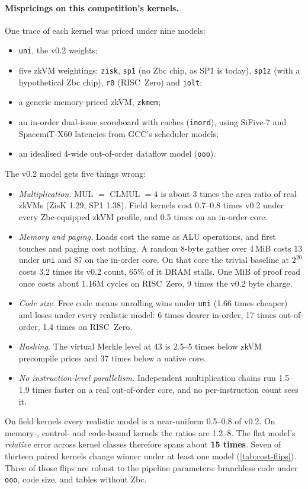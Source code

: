 \paragraph{Mispricings on this competition's kernels.} One trace of each kernel was priced under nine
models:
\begin{itemize}[nosep]
\item \texttt{uni}, the v0.2 weights;
\item five zkVM weightings: \texttt{zisk}, \texttt{sp1} (no Zbc chip, as SP1 is today), \texttt{sp1z}
  (with a hypothetical Zbc chip), \texttt{r0} (RISC~Zero) and \texttt{jolt};
\item a generic memory-priced zkVM, \texttt{zkmem};
\item an in-order dual-issue scoreboard with caches (\texttt{inord}), using SiFive-7 and SpacemiT-X60
  latencies from GCC's scheduler models;
\item an idealised 4-wide out-of-order dataflow model (\texttt{ooo}).
\end{itemize}
The v0.2 model gets five things wrong:
\begin{itemize}[nosep]
\item \emph{Multiplication.} MUL $=$ CLMUL $=4$ is about 3 times the area ratio of real zkVMs (ZisK
  1.29, SP1 1.38). Field kernels cost 0.7--0.8 times v0.2 under every Zbc-equipped zkVM profile, and
  0.5 times on an in-order core.
\item \emph{Memory and paging.} Loads cost the same as ALU operations, and first touches and paging
  cost nothing. A random 8-byte gather over 4\,MiB costs 13 under \texttt{uni} and 87 on the in-order
  core. On that core the trivial baseline at $2^{20}$ costs 3.2 times its v0.2 count, 65\% of it DRAM
  stalls. One MiB of proof read once costs about 1.16M cycles on RISC~Zero, 9 times the v0.2 byte
  charge.
\item \emph{Code size.} Free code means unrolling wins under \texttt{uni} (1.66 times cheaper) and loses
  under every realistic model: 6 times dearer in-order, 17 times out-of-order, 1.4 times on RISC~Zero.
\item \emph{Hashing.} The virtual Merkle level at 43 is 2.5--5 times below zkVM precompile prices and 37
  times below a native core.
\item \emph{No instruction-level parallelism.} Independent multiplication chains run 1.5--1.9 times faster
  on a real out-of-order core, and no per-instruction count sees it.
\end{itemize}
On field kernels every realistic model is a near-uniform 0.5--0.8 of v0.2. On memory-, control- and
code-bound kernels the ratios are 1.2--8. The flat model's \emph{relative} error across kernel
classes therefore spans about \textbf{15 times}. Seven of thirteen paired kernels change winner under
at least one model (\cref{tab:cost-flips}). Three of those flips are robust to the pipeline parameters:
branchless code under \texttt{ooo}, code size, and tables without Zbc.

